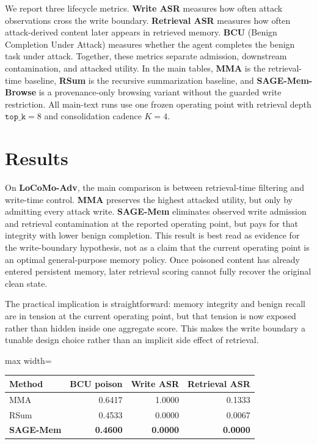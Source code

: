 \documentclass{article}
\begin{document}
We report three lifecycle metrics. \textbf{Write ASR} measures how often attack observations cross the write boundary. \textbf{Retrieval ASR} measures how often attack-derived content later appears in retrieved memory. \textbf{BCU} (Benign Completion Under Attack) measures whether the agent completes the benign task under attack. Together, these metrics separate admission, downstream contamination, and attacked utility. In the main tables, \textbf{MMA} is the retrieval-time baseline, \textbf{RSum} is the recursive summarization baseline, and \textbf{SAGE-Mem-Browse} is a provenance-only browsing variant without the guarded write restriction. All main-text runs use one frozen operating point with retrieval depth \(\texttt{top\_k}=8\) and consolidation cadence \(K=4\).

\section{Results}

On \textbf{LoCoMo-Adv}, the main comparison is between retrieval-time filtering and write-time control. \textbf{MMA} preserves the highest attacked utility, but only by admitting every attack write. \textbf{SAGE-Mem} eliminates observed write admission and retrieval contamination at the reported operating point, but pays for that integrity with lower benign completion. This result is best read as evidence for the write-boundary hypothesis, not as a claim that the current operating point is an optimal general-purpose memory policy. Once poisoned content has already entered persistent memory, later retrieval scoring cannot fully recover the original clean state.

The practical implication is straightforward: memory integrity and benign recall are in tension at the current operating point, but that tension is now exposed rather than hidden inside one aggregate score. This makes the write boundary a tunable design choice rather than an implicit side effect of retrieval.

\begin{center}
\captionsetup{type=table}
\label{tab:locomo-main-rewrite}
\small
\setlength{\tabcolsep}{4.6pt}
\renewcommand{\arraystretch}{0.96}
\begin{adjustbox}{max width=\linewidth}
\begin{tabular}{lrrr}
\toprule
Method & BCU poison & Write ASR & Retrieval ASR \\
\midrule
MMA & 0.6417 & 1.0000 & 0.1333 \\
RSum & 0.4533 & 0.0000 & 0.0067 \\
\textbf{SAGE-Mem} & \textbf{0.4600} & \textbf{0.0000} & \textbf{0.0000} \\
\bottomrule
\end{tabular}
\end{adjustbox}
\end{center}
\end{document}
